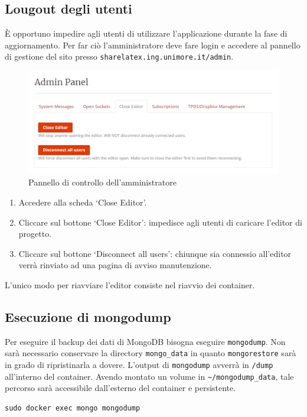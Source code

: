 \subsection{Lougout degli utenti}
È opportuno impedire agli utenti di utilizzare l'applicazione durante la fase di aggiornamento. Per far ciò l'amministratore deve fare login e accedere al pannello di gestione del sito presso \verb|sharelatex.ing.unimore.it/admin|.
\begin{figure}[h]
    \centering
    \includegraphics[width=\textwidth]{immagini/close_editor.PNG}
    \caption{Pannello di controllo dell'amministratore}
    \label{fig:close_editor}
\end{figure}
\begin{enumerate}
    \item Accedere alla scheda \enquote*{Close Editor}.
    \item Cliccare sul bottone \enquote*{Close Editor}: impedisce agli utenti di caricare l'editor di progetto.
    \item Cliccare sul bottone \enquote*{Disconnect all users}: chiunque sia connessio all'editor verrà rinviato ad una pagina di avviso manutenzione.
\end{enumerate}
L'unico modo per riavviare l'editor consiste nel riavvio dei container.

\subsection{Esecuzione di mongodump}
Per eseguire il backup dei dati di MongoDB bisogna eseguire \verb|mongodump|. Non sarà necessario conservare la directory \verb|mongo_data| in quanto \verb|mongorestore| sarà in grado di ripristinarla a dovere. L'output di \verb|mongodump| avverrà in \verb|/dump| all'interno del container. Avendo montato un volume in \verb|~/mongodump_data|, tale percorso sarà accessibile dall'esterno del container e persistente.
\begin{lstlisting}
sudo docker exec mongo mongodump
\end{lstlisting}

